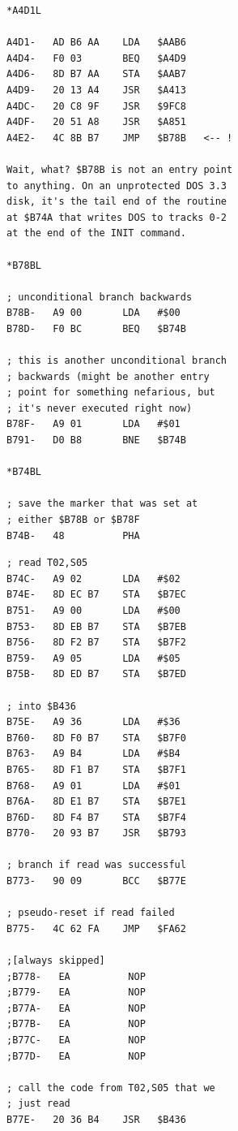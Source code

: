 \documentclass{article}
\begin{document}
\newpage

\begin{verbatim}
*A4D1L

A4D1-   AD B6 AA    LDA   $AAB6
A4D4-   F0 03       BEQ   $A4D9
A4D6-   8D B7 AA    STA   $AAB7
A4D9-   20 13 A4    JSR   $A413
A4DC-   20 C8 9F    JSR   $9FC8
A4DF-   20 51 A8    JSR   $A851
A4E2-   4C 8B B7    JMP   $B78B   <-- !

Wait, what? $B78B is not an entry point
to anything. On an unprotected DOS 3.3
disk, it's the tail end of the routine
at $B74A that writes DOS to tracks 0-2
at the end of the INIT command.

*B78BL

; unconditional branch backwards
B78B-   A9 00       LDA   #$00
B78D-   F0 BC       BEQ   $B74B

; this is another unconditional branch
; backwards (might be another entry
; point for something nefarious, but
; it's never executed right now)
B78F-   A9 01       LDA   #$01
B791-   D0 B8       BNE   $B74B

*B74BL

; save the marker that was set at
; either $B78B or $B78F
B74B-   48          PHA
\end{verbatim}

\newpage

\begin{verbatim}
; read T02,S05
B74C-   A9 02       LDA   #$02
B74E-   8D EC B7    STA   $B7EC
B751-   A9 00       LDA   #$00
B753-   8D EB B7    STA   $B7EB
B756-   8D F2 B7    STA   $B7F2
B759-   A9 05       LDA   #$05
B75B-   8D ED B7    STA   $B7ED

; into $B436
B75E-   A9 36       LDA   #$36
B760-   8D F0 B7    STA   $B7F0
B763-   A9 B4       LDA   #$B4
B765-   8D F1 B7    STA   $B7F1
B768-   A9 01       LDA   #$01
B76A-   8D E1 B7    STA   $B7E1
B76D-   8D F4 B7    STA   $B7F4
B770-   20 93 B7    JSR   $B793

; branch if read was successful
B773-   90 09       BCC   $B77E

; pseudo-reset if read failed
B775-   4C 62 FA    JMP   $FA62

;[always skipped]
;B778-   EA          NOP
;B779-   EA          NOP
;B77A-   EA          NOP
;B77B-   EA          NOP
;B77C-   EA          NOP
;B77D-   EA          NOP

; call the code from T02,S05 that we
; just read
B77E-   20 36 B4    JSR   $B436
\end{verbatim}
\end{document}
